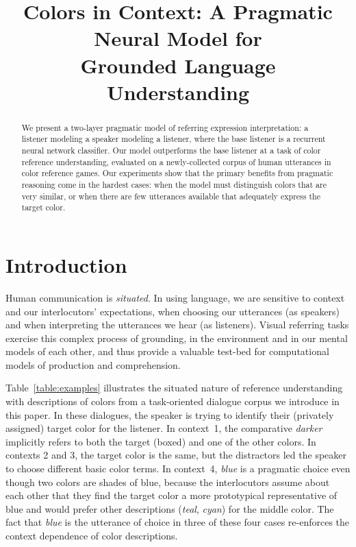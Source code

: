\documentclass[11pt,letterpaper]{article}
\title{Colors in Context: A Pragmatic Neural Model for \\
Grounded Language Understanding}
\author{}
\date{}
\newcommand{\word}{\textit}
\renewcommand{\|}{\mid}
\newcommand{\Tabref}[1]{Table~\ref{#1}}
\begin{document}
\maketitle
\begin{abstract}


We present a two-layer pragmatic model of referring expression interpretation:
a listener modeling a speaker modeling a listener, where the base listener is a
recurrent neural network classifier. Our model outperforms the
base listener at a task of color reference understanding, evaluated on a
newly-collected corpus of human utterances in color reference games.
Our experiments show that the primary benefits from pragmatic reasoning come
in the hardest cases: when the model must distinguish colors that are very
similar, or when there are few utterances available that adequately express
the target color.

\end{abstract}

\section{Introduction} \label{sec:intro}


Human communication is \emph{situated}. In using language, we are sensitive
to context and our interlocutors' expectations, when choosing our
utterances (as speakers) and when interpreting the utterances we hear (as listeners).
Visual referring tasks exercise this complex process of grounding, 
in the environment and in
our mental models of each other, and thus provide a valuable test-bed for
computational models of production and comprehension.

\Tabref{table:examples} illustrates the situated nature of
reference understanding with descriptions of colors from a task-oriented
dialogue corpus we
introduce in this paper. In these dialogues, the speaker is trying
to identify their (privately assigned) target color for the
listener. In context~1, the comparative \word{darker} implicitly
refers to both the target (boxed) and one of the other colors. In
contexts 2 and 3, the target color is the same, but the distractors
led the speaker to choose different basic color terms. In
context~4, \word{blue} is a pragmatic choice even though two colors are
shades of blue, because the interlocutors assume about each other that
they find the target color a more prototypical representative of blue
and would prefer other descriptions (\word{teal}, \word{cyan}) for the middle color.
The fact that \word{blue} is the utterance of choice in three of these
four cases re-enforces the context dependence of color descriptions.
\end{document}
